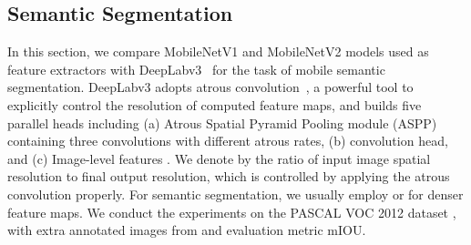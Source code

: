 \documentclass[10pt,twocolumn,letterpaper]{article}
\begin{document}
\begin{table}[!t]
  \centering
  \caption{
      Performance comparison of \mbox{MobileNetV2} + SSDLite and other realtime detectors on the COCO dataset object detection task.
      \mbox{MobileNetV2} + SSDLite achieves competitive accuracy with significantly fewer parameters and smaller computational complexity.
      All models are trained on \mbox{\tt trainval35k} and evaluated on \mbox{\tt test-dev}.
      \mbox{SSD/YOLOv2} numbers are from \cite{redmon2016yolo9000}.
      The running time is reported for the large core of the Google \mbox{Pixel 1} phone, using an internal version of the \mbox{TF-Lite} engine.
  }
  \label{tab:mobilenet_ssd}
\end{table}

\subsection{Semantic Segmentation}
In this section, we compare \mbox{MobileNetV1} and \mbox{MobileNetV2} models used as feature extractors with \mbox{DeepLabv3}~\cite{DeepLabV3} for the task of mobile semantic segmentation.
\mbox{DeepLabv3} adopts atrous convolution~\cite{Holschneider1989real, Sermanet2013Overfeat, Papandreou2014untangling}, a powerful tool to explicitly control the resolution of computed feature maps, and builds five parallel heads including (a) Atrous Spatial Pyramid Pooling module (ASPP) \cite{DeepLabV2} containing three  convolutions with different atrous rates, (b)  convolution head, and (c) Image-level features \cite{ParseNet}.
We denote by  the ratio of input image spatial resolution to final output resolution, which is controlled by applying the atrous convolution properly.
For semantic segmentation, we usually employ  or  for denser feature maps.
We conduct the experiments on the \mbox{PASCAL} VOC 2012 dataset \cite{PASCAL}, with extra annotated images from \cite{Hariharan2011semantic} and evaluation metric mIOU.
\end{document}
